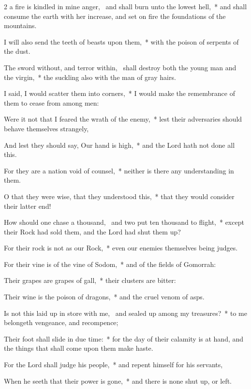 \begin{multicols}{2}
 a fire is kindled in mine anger,~{\dag} and shall burn unto the lowest hell,~* and shall consume the earth with her increase, and set on fire the foundations of the mountains.\par
{}
I will also send the teeth of beasts upon them,~* with the poison of serpents of the dust.\par
The sword without, and terror within,~{\dag} shall destroy both the young man and the virgin,~* the suckling also with the man of gray hairs.\par
I said, I would scatter them into corners,~* I would make the remembrance of them to cease from among men:\par
Were it not that I feared the wrath of the enemy,~* lest their adversaries should behave themselves strangely,\par
And lest they should say, Our hand is high,~* and the Lord hath not done all this.\par
For they are a nation void of counsel,~* neither is there any understanding in them.\par
O that they were wise, that they understood this,~* that they would consider their latter end!\par
How should one chase a thousand,~{\dag} and two put ten thousand to flight,~* except their Rock had sold them, and the Lord had shut them up?\par
For their rock is not as our Rock,~* even our enemies themselves being judges.\par
For their vine is of the vine of Sodom,~* and of the fields of Gomorrah:\par
Their grapes are grapes of gall,~* their clusters are bitter:\par
Their wine is the poison of dragons,~* and the cruel venom of asps.\par
Is not this laid up in store with me,~{\dag} and sealed up among my treasures?~* to me belongeth vengeance, and recompence;\par
Their foot shall slide in due time:~* for the day of their calamity is at hand, and the things that shall come upon them make haste.\par
For the Lord shall judge his people,~* and repent himself for his servants,\par
When he seeth that their power is gone,~* and there is none shut up, or left.\par

\end{multicols}
